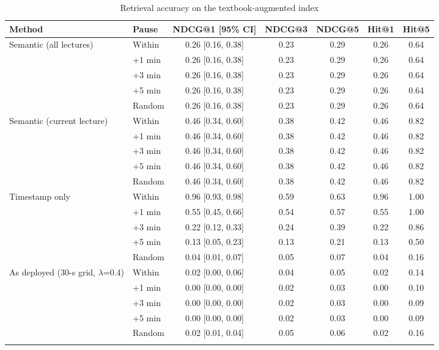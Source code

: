 \begin{table}[!htbp]
\centering
\caption{Retrieval accuracy on the textbook-augmented index}
\label{tab:sup_retrievaltextbook}
\small
\begin{tabular}{llccccc}
\toprule
\textbf{Method} & \textbf{Pause} & \textbf{NDCG@1 [95\% CI]} & \textbf{NDCG@3} & \textbf{NDCG@5} & \textbf{Hit@1} & \textbf{Hit@5} \\
\midrule
Semantic (all lectures) & Within & 0.26 [0.16, 0.38] & 0.23 & 0.29 & 0.26 & 0.64 \\
 & +1 min & 0.26 [0.16, 0.38] & 0.23 & 0.29 & 0.26 & 0.64 \\
 & +3 min & 0.26 [0.16, 0.38] & 0.23 & 0.29 & 0.26 & 0.64 \\
 & +5 min & 0.26 [0.16, 0.38] & 0.23 & 0.29 & 0.26 & 0.64 \\
 & Random & 0.26 [0.16, 0.38] & 0.23 & 0.29 & 0.26 & 0.64 \\
\addlinespace
Semantic (current lecture) & Within & 0.46 [0.34, 0.60] & 0.38 & 0.42 & 0.46 & 0.82 \\
 & +1 min & 0.46 [0.34, 0.60] & 0.38 & 0.42 & 0.46 & 0.82 \\
 & +3 min & 0.46 [0.34, 0.60] & 0.38 & 0.42 & 0.46 & 0.82 \\
 & +5 min & 0.46 [0.34, 0.60] & 0.38 & 0.42 & 0.46 & 0.82 \\
 & Random & 0.46 [0.34, 0.60] & 0.38 & 0.42 & 0.46 & 0.82 \\
\addlinespace
Timestamp only & Within & 0.96 [0.93, 0.98] & 0.59 & 0.63 & 0.96 & 1.00 \\
 & +1 min & 0.55 [0.45, 0.66] & 0.54 & 0.57 & 0.55 & 1.00 \\
 & +3 min & 0.22 [0.12, 0.33] & 0.24 & 0.39 & 0.22 & 0.86 \\
 & +5 min & 0.13 [0.05, 0.23] & 0.13 & 0.21 & 0.13 & 0.50 \\
 & Random & 0.04 [0.01, 0.07] & 0.05 & 0.07 & 0.04 & 0.16 \\
\addlinespace
As deployed (30-s grid, $\lambda$=0.4) & Within & 0.02 [0.00, 0.06] & 0.04 & 0.05 & 0.02 & 0.14 \\
 & +1 min & 0.00 [0.00, 0.00] & 0.02 & 0.03 & 0.00 & 0.10 \\
 & +3 min & 0.00 [0.00, 0.00] & 0.02 & 0.03 & 0.00 & 0.09 \\
 & +5 min & 0.00 [0.00, 0.00] & 0.02 & 0.03 & 0.00 & 0.09 \\
 & Random & 0.02 [0.01, 0.04] & 0.05 & 0.06 & 0.02 & 0.16 \\
\addlinespace

\end{tabular}
\end{table}
